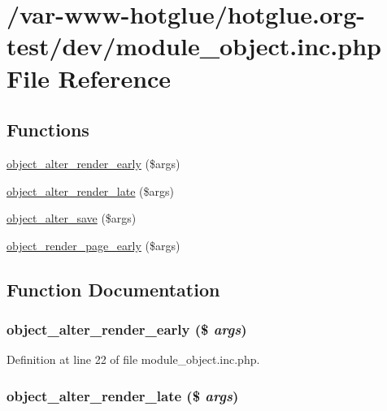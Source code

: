 \hypertarget{module__object_8inc_8php}{
\section{/var-\/www-\/hotglue/hotglue.org-\/test/dev/module\_\-object.inc.php File Reference}
\label{module__object_8inc_8php}
}
\subsection*{Functions}
\begin{DoxyCompactItemize}
\item 
\hyperlink{module__object_8inc_8php_a6acc3273ff9872e01527162375d318d8}{object\_\-alter\_\-render\_\-early} (\$args)
\item 
\hyperlink{module__object_8inc_8php_a6b5bf16a15b7d5809bd7c6d15cd05a52}{object\_\-alter\_\-render\_\-late} (\$args)
\item 
\hyperlink{module__object_8inc_8php_aba3a00b339dc7e9831b48a94f4f8e211}{object\_\-alter\_\-save} (\$args)
\item 
\hyperlink{module__object_8inc_8php_ad06c13f1778d655f4a011d1763c6e618}{object\_\-render\_\-page\_\-early} (\$args)
\end{DoxyCompactItemize}


\subsection{Function Documentation}
\hypertarget{module__object_8inc_8php_a6acc3273ff9872e01527162375d318d8}{
\subsubsection[{object\_\-alter\_\-render\_\-early}]{\setlength{\rightskip}{0pt plus 5cm}object\_\-alter\_\-render\_\-early (\$ {\em args})}}
\label{module__object_8inc_8php_a6acc3273ff9872e01527162375d318d8}


Definition at line 22 of file module\_\-object.inc.php.

\hypertarget{module__object_8inc_8php_a6b5bf16a15b7d5809bd7c6d15cd05a52}{
\subsubsection[{object\_\-alter\_\-render\_\-late}]{\setlength{\rightskip}{0pt plus 5cm}object\_\-alter\_\-render\_\-late (\$ {\em args})}}
\label{module__object_8inc_8php_a6b5bf16a15b7d5809bd7c6d15cd05a52}


